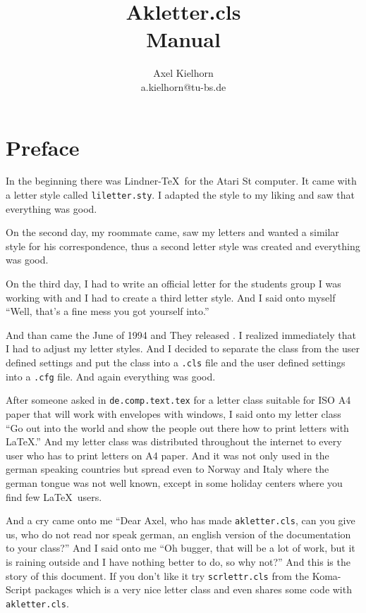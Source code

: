 \documentclass[a4paper]{article}
\title{Akletter.cls\\Manual}
\author{Axel Kielhorn\\a.kielhorn@tu-bs.de}
\begin{document}
\maketitle

\section{Preface}

In the beginning there was Lindner-\TeX\ for the Atari St computer. It 
came with a letter style called \verb+liletter.sty+. I adapted the 
style to my liking and saw that everything was good.

On the second day, my roommate came, saw my letters and wanted a 
similar style for his correspondence, thus a second letter style was 
created and everything was good.

On the third day, I had to write an official letter for the students 
group I was working with and I had to create a third letter style. 
And I said onto myself ``Well, that's a fine mess you got yourself 
into.''

And than came the June of 1994 and They released \LaTeXe. I realized 
immediately that I had to adjust my letter styles. And I decided to 
separate the class from the user defined settings and put the class 
into a \verb+.cls+ file and the user defined settings into a 
\verb+.cfg+ file. And again everything was good.

After someone asked in \verb+de.comp.text.tex+ for a letter class 
suitable for ISO A4 paper that will work with envelopes with windows, I 
said onto my letter class ``Go out into the world and show the people 
out there how to print letters with \LaTeX.'' And my letter class was 
distributed throughout the internet to every user who has to print 
letters on A4 paper. And it was not only used in the german speaking 
countries but spread even to Norway and Italy where the german tongue 
was not well known, except in some holiday centers where you find 
few \LaTeX\ users.

And a cry came onto me ``Dear Axel, who has made \verb+akletter.cls+, 
can you give us, who do not read nor speak german, an english version 
of the documentation to your class?'' And I said onto me ``Oh bugger, 
that will be a lot of work, but it is raining outside and I have 
nothing better to do, so why not?'' And this is the story of this 
document. If you don't like it try \verb+scrlettr.cls+ from the 
Koma-Script packages which is a very nice letter class and even 
shares some code with \verb+akletter.cls+.
\end{document}
